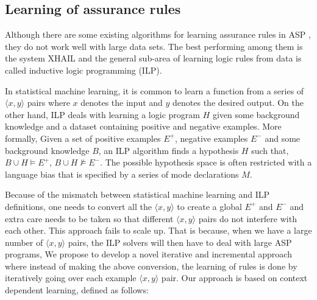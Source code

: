 \subsection{Learning of assurance rules}



Although there are some existing algorithms for learning assurance rules in ASP \cite{ray2009nonmonotonic,athakravi2013learning,law2014inductive,athakravi2015inductive,iled,kazmi2017improving}, they do not work well with large data sets. The best performing among them is the system XHAIL and the general sub-area of learning logic rules from data is called inductive logic programming (ILP). 

In statistical machine learning, it is common to learn a function from a series of $\langle x, y \rangle$ pairs where $x$ denotes the input and $y$ denotes the desired output. On the other hand, ILP deals with learning a logic program $H$ given some background knowledge and a dataset containing positive and negative examples. More formally, Given a set of positive examples $E^{+}$, negative examples $E^{−}$ and some background knowledge $B$, an ILP algorithm \cite{muggleton1991inductive} finds a hypothesis $H$ such that, $B \cup H  \models E^{+}$, $B \cup H \not \models E^{−}$. The possible hypothesis space is often restricted with a language bias that is specified by a series of mode declarations $M$.

Because of the mismatch between statistical machine learning and ILP definitions, one needs to convert all the $\langle x,y \rangle$ to create a global $E^{+}$ and $E^{−}$ and extra care needs to be taken so that different $\langle x,y \rangle$   pairs do not interfere with each other.  This approach fails to scale up. That is because, when we have a large  number of $\langle x,y \rangle$  pairs, the ILP solvers will then have to deal with large ASP programs,  We propose to develop a novel iterative and incremental approach where instead of making the above conversion, the learning of rules is done by iteratively going over each example $\langle x,y \rangle$ pair.  Our approach is based on context dependent learning, defined as follows:

